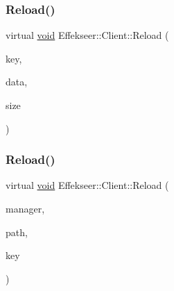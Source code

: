 \subsubsection{\texorpdfstring{Reload()}{Reload()}\hspace{0.1cm}{\footnotesize\ttfamily [1/2]}}
{\footnotesize\ttfamily virtual \mbox{\hyperlink{namespace_effekseer_ab34c4088e512200cf4c2716f168deb56}{void}} Effekseer\+::\+Client\+::\+Reload (\begin{DoxyParamCaption}\item[{const \mbox{\hyperlink{_effekseer_8h_a50b026abea014b47854bcd835b3b6233}{E\+F\+K\+\_\+\+C\+H\+AR}} $\ast$}]{key,  }\item[{\mbox{\hyperlink{namespace_effekseer_ab34c4088e512200cf4c2716f168deb56}{void}} $\ast$}]{data,  }\item[{int32\+\_\+t}]{size }\end{DoxyParamCaption})\hspace{0.3cm}{\ttfamily [pure virtual]}}

\mbox{\label{class_effekseer_1_1_client_a82cb4bc702a7cb270dd141fec9f62812}} 
\subsubsection{\texorpdfstring{Reload()}{Reload()}\hspace{0.1cm}{\footnotesize\ttfamily [2/2]}}
{\footnotesize\ttfamily virtual \mbox{\hyperlink{namespace_effekseer_ab34c4088e512200cf4c2716f168deb56}{void}} Effekseer\+::\+Client\+::\+Reload (\begin{DoxyParamCaption}\item[{\mbox{\hyperlink{class_effekseer_1_1_manager}{Manager}} $\ast$}]{manager,  }\item[{const \mbox{\hyperlink{_effekseer_8h_a50b026abea014b47854bcd835b3b6233}{E\+F\+K\+\_\+\+C\+H\+AR}} $\ast$}]{path,  }\item[{const \mbox{\hyperlink{_effekseer_8h_a50b026abea014b47854bcd835b3b6233}{E\+F\+K\+\_\+\+C\+H\+AR}} $\ast$}]{key }\end{DoxyParamCaption})\hspace{0.3cm}{\ttfamily [pure virtual]}}

\mbox{\label{class_effekseer_1_1_client_a8ccf03136f886a34baeabcfd6d3e5cb4}} 
